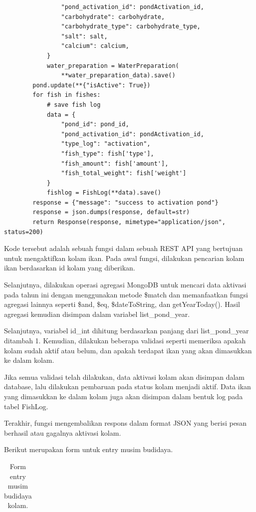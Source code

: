 \begin{enumerate}[1.]
\begin{lstlisting}
                "pond_activation_id": pondActivation_id,
                "carbohydrate": carbohydrate,
                "carbohydrate_type": carbohydrate_type,
                "salt": salt,
                "calcium": calcium,
            }
            water_preparation = WaterPreparation(
                **water_preparation_data).save()
        pond.update(**{"isActive": True})
        for fish in fishes:
            # save fish log
            data = {
                "pond_id": pond_id,
                "pond_activation_id": pondActivation_id,
                "type_log": "activation",
                "fish_type": fish['type'],
                "fish_amount": fish['amount'],
                "fish_total_weight": fish['weight']
            }
            fishlog = FishLog(**data).save()
        response = {"message": "success to activation pond"}
        response = json.dumps(response, default=str)
        return Response(response, mimetype="application/json", status=200)
\end{lstlisting}

Kode tersebut adalah sebuah fungsi dalam sebuah REST API yang bertujuan untuk mengaktifkan kolam ikan. Pada awal fungsi, dilakukan pencarian kolam ikan berdasarkan id kolam yang diberikan.

Selanjutnya, dilakukan operasi agregasi MongoDB untuk mencari data aktivasi pada tahun ini dengan menggunakan metode \$match dan memanfaatkan fungsi agregasi lainnya seperti \$and, \$eq, \$dateToString, dan getYearToday(). Hasil agregasi kemudian disimpan dalam variabel list\_pond\_year.

Selanjutnya, variabel id\_int dihitung berdasarkan panjang dari list\_pond\_year ditambah 1. Kemudian, dilakukan beberapa validasi seperti memeriksa apakah kolam sudah aktif atau belum, dan apakah terdapat ikan yang akan dimasukkan ke dalam kolam.

Jika semua validasi telah dilakukan, data aktivasi kolam akan disimpan dalam database, lalu dilakukan pembaruan pada status kolam menjadi aktif. Data ikan yang dimasukkan ke dalam kolam juga akan disimpan dalam bentuk log pada tabel FishLog.

Terakhir, fungsi mengembalikan respons dalam format JSON yang berisi pesan berhasil atau gagalnya aktivasi kolam.

Berikut merupakan form untuk entry musim budidaya.

\begin{longtable}{| l | p{5cm} | p{5cm} |}
\caption{Form entry musim budidaya kolam.\label{table:form_entry_musim_budidaya}}\\


\end{longtable}
\end{enumerate}
